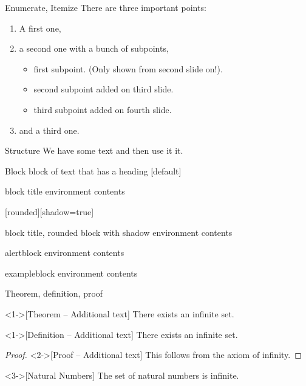 \begin{frame}{Enumerate, Itemize}
  There are three important points:
  \begin{enumerate}
    \item<1-> A first one,
    \item<2-> a second one with a bunch of subpoints,
  \begin{itemize}
    \item first subpoint. (Only shown from second slide on!).
    \item<3-> second subpoint added on third slide.
    \item<4-> third subpoint added on fourth slide.
  \end{itemize}
    \item<5-> and a third one.
  \end{enumerate}
\end{frame}


\begin{frame}{Structure}
  We have some text and then use  it it.
\end{frame}

\begin{frame}{Block}
  block of text that has a heading
  [default]
  \begin{block}{block title}
  environment contents
  \end{block}
  [rounded][shadow=true]
  \begin{block}{block title, rounded block with shadow}
  environment contents
  \end{block}
  \begin{alertblock}{alertblock}
  environment contents
  \end{alertblock}
  \begin{exampleblock}{exampleblock}
  environment contents
  \end{exampleblock}
\end{frame}


\begin{frame}{Theorem, definition, proof}
  \begin{theorem}<1->[Theorem -- Additional text]
  There exists an infinite set.
  \end{theorem}
  \begin{definition}<1->[Definition -- Additional text]
  There exists an infinite set.
  \end{definition}
  \begin{proof}<2->[Proof -- Additional text]
  This follows from the axiom of infinity.
  \end{proof}
  \begin{example}<3->[Natural Numbers]
  The set of natural numbers is infinite.
  \end{example}
\end{frame}




